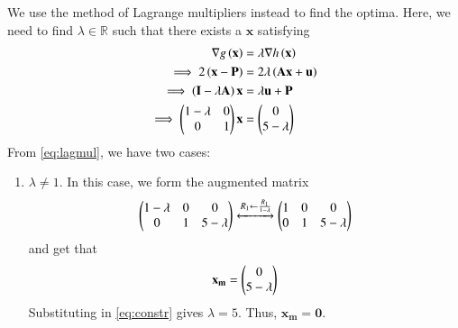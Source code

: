 \documentclass[journal,12pt,twocolumn]{IEEEtran}
\renewcommand{\vec}[1]{\boldsymbol{\mathbf{#1}}}
\begin{document}
\begin{enumerate}
    We use the method of Lagrange multipliers instead to find the optima. Here, 
    we need to find $\lambda \in \mathbb{R}$ such that there exists a $\vec{x}$ 
    satisfying
    \begin{align}
        \nabla g\brak{\vec{x}} &= \lambda\nabla h\brak{\vec{x}} \\
        \implies 2\brak{\vec{x}-\vec{P}} &= 2\lambda\brak{\vec{Ax}+\vec{u}} \\
        \implies \brak{\vec{I}-\lambda\vec{A}}\vec{x} &= \lambda\vec{u} + \vec{P} \\
        \implies \myvec{1-\lambda&0\\0&1}\vec{x} &= \myvec{0\\5-\lambda}
        \label{eq:lagmul}
    \end{align}
    From \eqref{eq:lagmul}, we have two cases:
    \begin{enumerate}
        \item $\lambda \neq 1$. In this case, we form the augmented matrix
        \begin{align}
            \begin{pmatrix}1-\lambda&0&0\\0&1&5-\lambda\end{pmatrix} \xleftrightarrow[]{R_1 \leftarrow \frac{R_1}{1-\lambda}} \begin{pmatrix}1&0&0\\0&1&5-\lambda\end{pmatrix}
        \end{align}
        and get that
        \begin{align}
            \vec{x_m} = \myvec{0\\5-\lambda}
        \end{align}
        Substituting in \eqref{eq:constr} gives $\lambda = 5$. Thus, 
        $\vec{x_m} = \vec{0}$.


\end{enumerate}
\end{enumerate}
\end{document}
